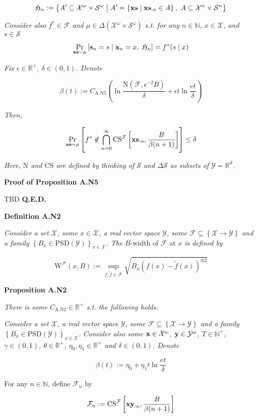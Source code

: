 \documentclass[a4paper]{article}
\newcommand{\Co}[1]{}
\newcommand{\AP}[1]{\left(#1\right)}
\newcommand{\AB}[1]{\left[#1\right]}
\newcommand{\AC}[1]{\left\{#1\right\}}
\newcommand{\ABM}[2]{\left[#1\;\middle\vert\;#2\right]}
\newcommand{\ACM}[2]{\left\{#1\;\middle\vert\;#2\right\}}
\newcommand{\Pa}[2]{\underset{#1}{\operatorname{Pr}}\AB{#2}}
\newcommand{\CP}[3]{\underset{#1}{\operatorname{Pr}}\ABM{#2}{#3}}
\newcommand{\Nats}{\mathbb{N}}
\newcommand{\Reals}{\mathbb{R}}
\newcommand{\PSD}{\mathrm{PSD}}
\newcommand{\B}{B}
\newcommand{\X}{\mathcal{X}}
\newcommand{\Y}{\mathcal{Y}}
\newcommand{\F}{\mathcal{F}}
\newcommand{\St}{\mathcal{S}}
\newcommand{\N}{\mathrm{N}}
\newcommand{\CS}{\mathrm{CS}}
\newcommand{\W}{\mathrm{W}}
\begin{document}
$$\mathfrak{H}_n:=\ACM{A'\subseteq\X^\omega\times\St^\omega}{A'=\ACM{\bold{xs}}{\bold{xs}_{:n}\in A},\ A\subseteq\X^n\times\St^n}$$

\textit{Consider also $f^*\in\F$ and $\mu\in\Delta\AP{\X^\omega\times\St^\omega}$ s.t. for any $n\in\Nats$, $x\in\X$, and $s\in\St$}\Co{i}

$$\CP{\bold{xs}\sim\mu}{\bold{s}_n=s}{\bold{x}_n=x,\ \mathfrak{H}_n} = f^*(s\mid x)$$

\textit{Fix $\epsilon\in\Reals^+$, $\delta\in(0,1)$. Denote}\Co{i}

$$\beta(t):=C_{\mathrm{A.N5}}\AP{\ln{\frac{\N(\F,\epsilon^{-2}\B )}{\delta}}+\epsilon t\ln{\frac{et}{\delta}}}$$

\textit{Then,}\Co{i}

$$\Pa{\bold{xs}\sim\mu}{f^*\not\in\bigcap_{n=0}^\infty\CS^\F\AB{\bold{xs}_{:n},\frac{\B }{\beta(n+1)}}} \leq \delta$$

\textit{Here, $\N$ and $\CS$ are defined by thinking of $\St$ and $\Delta\St$ as subsets of $\Y=\Reals^\St$.}\Co{i}

\textbf{Proof of Proposition A.N5}\Co{b}

TBD \textbf{Q.E.D.}\Co{b}

\Co{b}

\textbf{Definition A.N2}\Co{b}

\textit{Consider a set $\X$, some $x\in\X$, a real vector space $\Y$, some $\F\subseteq\AC{\X\rightarrow\Y}$ and a family $\AC{\B _x\in\PSD(\Y)}_{x\in\X}$. The}\Co{i} $\B $-width of $\F$ at $x$ \textit{is defined by}\Co{i}

$$\W^\F(x,B):=\sup_{f,\tilde{f}\in\F}\sqrt{\B _x\AP{f(x)-\tilde{f}(x)}^{\otimes2}}$$  

\textbf{Proposition A.N2}\Co{b}

\textit{There is some $C_{\mathrm{A.N2}}\in\Reals^+$ s.t. the following holds.}\Co{i}

\textit{Consider a set $\X$, a real vector space $\Y$, some $\F\subseteq\AC{\X\rightarrow\Y}$ and a family $\AC{\B _x\in\PSD(\Y)}_{x\in\X}$. Consider also some $\bold{x}\in\X^\omega$, $\bold{y}\in\Y^\omega$, $T\in\Nats^+$, $\gamma\in(0,1)$, $\theta\in\Reals^+$, $\eta_0,\eta_1\in\Reals^+$ and $\delta\in(0,1)$. Denote}\Co{i}

$$\beta(t):=\eta_0 + \eta_1t\ln{\frac{et}{\delta}}$$

For any $n\in\Nats$, define $\F_n$ by

$$\F_n:=\CS^\F\AB{\bold{xy}_{:n},\frac{\B }{\beta(n+1)}}$$
\end{document}
